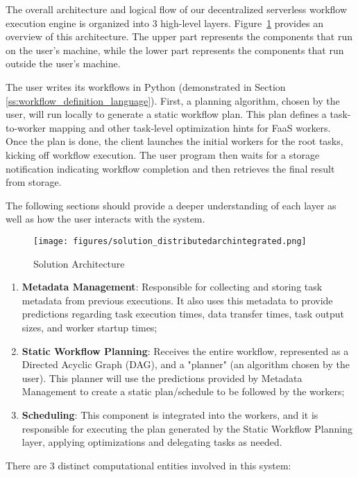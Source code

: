 \documentclass[conference]{IEEEtran}
\begin{document}
The overall architecture and logical flow of our decentralized serverless workflow execution engine is organized into 3 high-level layers. Figure~\ref{fig:solution_architecture} provides an overview of this architecture. The upper part represents the components that run on the user's machine, while the lower part represents the components that run outside the user's machine. 

The user writes its workflows in Python (demonstrated in Section \ref{ss:workflow_definition_language}). First, a planning algorithm, chosen by the user, will run locally to generate a static workflow plan. This plan defines a task-to-worker mapping and other task-level optimization hints for FaaS workers. Once the plan is done, the client launches the initial workers for the root tasks, kicking off workflow execution. The user program then waits for a storage notification indicating workflow completion and then retrieves the final result from storage.

The following sections should provide a deeper understanding of each layer as well as how the user interacts with the system.

\begin{figure}[h]
  \centering
  \texttt{[image: figures/solution\_distributedarchintegrated.png]}
  \caption{Solution Architecture}
  \label{fig:solution_architecture}
\end{figure}

\begin{enumerate}
    \item \textbf{Metadata Management}: Responsible for collecting and storing task metadata from previous executions. It also uses this metadata to provide predictions regarding task execution times, data transfer times, task output sizes, and worker startup times;
    \item \textbf{Static Workflow Planning}: Receives the entire workflow, represented as a Directed Acyclic Graph (DAG), and a "planner" (an algorithm chosen by the user). This planner will use the predictions provided by Metadata Management to create a static plan/schedule to be followed by the workers;
    \item \textbf{Scheduling}: This component is integrated into the workers, and it is responsible for executing the plan generated by the Static Workflow Planning layer, applying optimizations and delegating tasks as needed.
\end{enumerate}

There are 3 distinct computational entities involved in this system:
\end{document}
